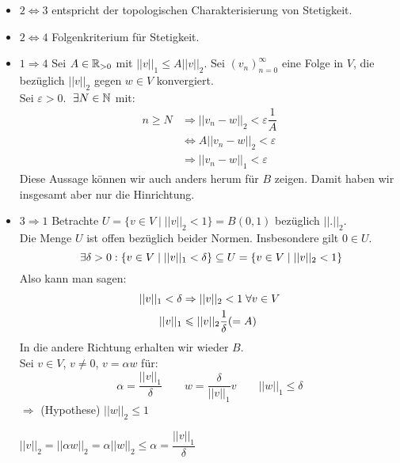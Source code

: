 \documentclass[main.tex]{subfiles}
\begin{document}
\begin{Beweis}
  \begin{itemize}
    \item $2 \Leftrightarrow 3$ entspricht der topologischen Charakterisierung von Stetigkeit.
    \item $2 \Leftrightarrow 4$ Folgenkriterium für Stetigkeit.
    \item $1 \Rightarrow 4$ Sei $A \in \mathbb{R}_{> 0}$ mit $||v||_1 \leq A ||v||_2$. Sei $(v_n)_{n=0}^\infty$ eine Folge in $V$, die bezüglich $||v||_2$ gegen $w \in V$ konvergiert.\\
      Sei $\varepsilon > 0$. $\;\exists N \in \mathbb{N}$ mit:
      $$\begin{aligned}
        n \geq N &\Rightarrow ||v_n - w||_2 < \varepsilon \dfrac{1}{A}\\
        &\Leftrightarrow A ||v_n - w||_2 < \varepsilon\\
        &\Rightarrow ||v_n - w||_1 < \varepsilon
      \end{aligned}$$
      Diese Aussage können wir auch anders herum für $B$ zeigen. Damit haben wir insgesamt aber nur die Hinrichtung.
    \item $3 \Rightarrow 1$ Betrachte $U = \{v \in V \mid ||v||_2 < 1 \} = B(0,1)$ bezüglich $||.||_2$.\\
      Die Menge $U$ ist offen bezüglich beider Normen. Insbesondere gilt $0 \in U$.\\
      $$\;\exists \delta > 0 : \{v\in V \mid ||v||_1 < \delta \} \subseteq U =\{v\in V \mid ||v||_2 < 1\}$$
      Also kann man sagen:
      $$\begin{aligned}
        ||v||_1 < \delta &\Rightarrow ||v||_2 < 1 \;\forall v \in V \\
        ||v||_1 &\leqslant ||v||_2 \dfrac{1}{\delta} (= A)
      \end{aligned}$$
      In die andere Richtung erhalten wir wieder $B$.\\
      Sei $v \in V$, $v \neq 0$, $v = \alpha w$ für:
      $$\alpha = \dfrac{||v||_1}{\delta} \qquad w = \dfrac{\delta}{||v||_1} v \qquad ||w||_1 \leq \delta$$
      $\Rightarrow$ (Hypothese) $||w||_2 \leq 1$

      $||v||_2 = ||\alpha w||_2 = \alpha ||w||_2 \leq \alpha = \dfrac{||v||_1}{\delta}$
  \end{itemize}
\end{Beweis}
\end{document}
